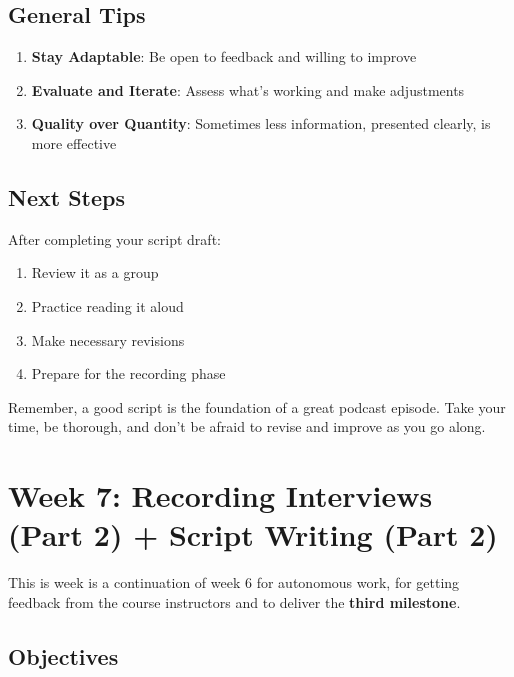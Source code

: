 \documentclass[
  letterpaper,
  DIV=11,
  numbers=noendperiod]{scrreprt}
\providecommand{\tightlist}{%
  \setlength{\itemsep}{0pt}\setlength{\parskip}{0pt}}\usepackage{longtable,booktabs,array}
\begin{document}
\section{General Tips}\label{general-tips}

\begin{enumerate}
\def\labelenumi{\arabic{enumi}.}
\tightlist
\item
  \textbf{Stay Adaptable}: Be open to feedback and willing to improve
\item
  \textbf{Evaluate and Iterate}: Assess what's working and make
  adjustments
\item
  \textbf{Quality over Quantity}: Sometimes less information, presented
  clearly, is more effective
\end{enumerate}

\section{Next Steps}\label{next-steps-6}

After completing your script draft:

\begin{enumerate}
\def\labelenumi{\arabic{enumi}.}
\tightlist
\item
  Review it as a group
\item
  Practice reading it aloud
\item
  Make necessary revisions
\item
  Prepare for the recording phase
\end{enumerate}

Remember, a good script is the foundation of a great podcast episode.
Take your time, be thorough, and don't be afraid to revise and improve
as you go along.

\chapter{Week 7: Recording Interviews (Part 2) + Script Writing (Part
2)}\label{week-7-recording-interviews-part-2-script-writing-part-2-1}

This is week is a continuation of week 6 for autonomous work, for
getting feedback from the course instructors and to deliver the
\textbf{third milestone}.

\section{Objectives}\label{objectives-5}
\end{document}
